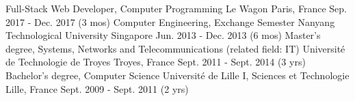 
\begin{cventries}

  \cventry
    {Full-Stack Web Developer, Computer Programming}
    {Le Wagon}
    {Paris, France}
    {Sep. 2017 - Dec. 2017 (3 mos)}
    {}
  \cventry
    {Computer Engineering, Exchange Semester}
    {Nanyang Technological University}
    {Singapore}
    {Jun. 2013 - Dec. 2013 (6 mos)}
    {}
  \cventry
    {Master's degree, Systems, Networks and Telecommunications (related field: IT)}
    {Université de Technologie de Troyes}
    {Troyes, France}
    {Sept. 2011 - Sept. 2014 (3 yrs)}
    {}
  \cventry
    {Bachelor's degree, Computer Science}
    {Université de Lille I, Sciences et Technologie}
    {Lille, France}
    {Sept. 2009 - Sept. 2011 (2 yrs)}
    {}
\end{cventries}
